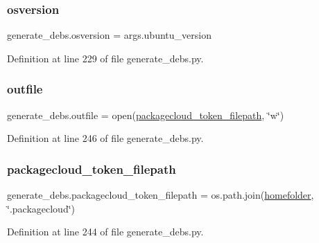 \subsubsection{\texorpdfstring{osversion}{osversion}}
{\footnotesize\ttfamily generate\+\_\+debs.\+osversion = args.\+ubuntu\+\_\+version}



Definition at line 229 of file generate\+\_\+debs.\+py.

\mbox{\label{namespacegenerate__debs_aa1faa039b35b72ee44dc6f106ad12911}} 
\subsubsection{\texorpdfstring{outfile}{outfile}}
{\footnotesize\ttfamily generate\+\_\+debs.\+outfile = open(\hyperlink{namespacegenerate__debs_a836a20b989c3c8e46255d91d10cb524f}{packagecloud\+\_\+token\+\_\+filepath}, \char`\"{}w\char`\"{})}



Definition at line 246 of file generate\+\_\+debs.\+py.

\mbox{\label{namespacegenerate__debs_a836a20b989c3c8e46255d91d10cb524f}} 
\subsubsection{\texorpdfstring{packagecloud\+\_\+token\+\_\+filepath}{packagecloud\_token\_filepath}}
{\footnotesize\ttfamily generate\+\_\+debs.\+packagecloud\+\_\+token\+\_\+filepath = os.\+path.\+join(\hyperlink{namespacegenerate__debs_aeb83979be2939a8059435a906a91f682}{homefolder}, \char`\"{}.packagecloud\char`\"{})}



Definition at line 244 of file generate\+\_\+debs.\+py.

\mbox{\label{namespacegenerate__debs_a40d4732827c5678f3f48354238245e1d}} 
